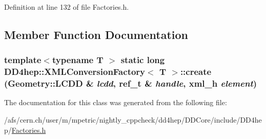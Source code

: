 Definition at line 132 of file Factories.h.

\subsection{Member Function Documentation}
\hypertarget{class_d_d4hep_1_1_x_m_l_conversion_factory_af1d0a581aaec7bc8a40aeb01e6b2929e}{
\subsubsection[{create}]{\setlength{\rightskip}{0pt plus 5cm}template$<$typename T $>$ static long {\bf DD4hep::XMLConversionFactory}$<$ {\bf T} $>$::create ({\bf Geometry::LCDD} \& {\em lcdd}, \/  {\bf ref\_\-t} \& {\em handle}, \/  {\bf xml\_\-h} {\em element})}}
\label{class_d_d4hep_1_1_x_m_l_conversion_factory_af1d0a581aaec7bc8a40aeb01e6b2929e}


The documentation for this class was generated from the following file:\begin{DoxyCompactItemize}
\item 
/afs/cern.ch/user/m/mpetric/nightly\_\-cppcheck/dd4hep/DDCore/include/DD4hep/\hyperlink{_d_d_core_2include_2_d_d4hep_2_factories_8h}{Factories.h}\end{DoxyCompactItemize}
